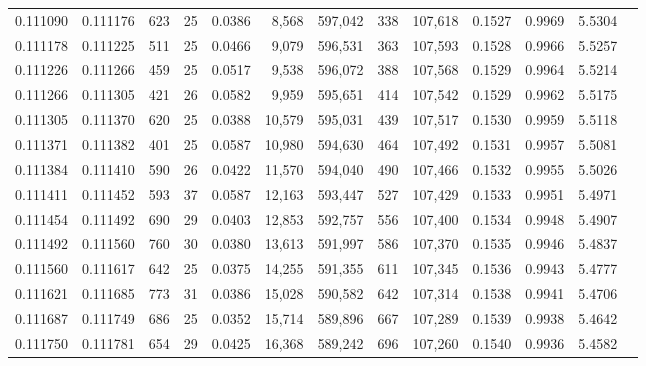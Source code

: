 \begin{tabular}{rrrrrrrrrrrrr}
0.111090 & 0.111176 & 623 &  25 &                                     0.0386 &   8,568 & 597,042 &     338 & 107,618 & 0.1527 & 0.9969 & 5.5304 \\
0.111178 & 0.111225 & 511 &  25 &                                     0.0466 &   9,079 & 596,531 &     363 & 107,593 & 0.1528 & 0.9966 & 5.5257 \\
0.111226 & 0.111266 & 459 &  25 &                                     0.0517 &   9,538 & 596,072 &     388 & 107,568 & 0.1529 & 0.9964 & 5.5214 \\
0.111266 & 0.111305 & 421 &  26 &                                     0.0582 &   9,959 & 595,651 &     414 & 107,542 & 0.1529 & 0.9962 & 5.5175 \\
0.111305 & 0.111370 & 620 &  25 &                                     0.0388 &  10,579 & 595,031 &     439 & 107,517 & 0.1530 & 0.9959 & 5.5118 \\
0.111371 & 0.111382 & 401 &  25 &                                     0.0587 &  10,980 & 594,630 &     464 & 107,492 & 0.1531 & 0.9957 & 5.5081 \\
0.111384 & 0.111410 & 590 &  26 &                                     0.0422 &  11,570 & 594,040 &     490 & 107,466 & 0.1532 & 0.9955 & 5.5026 \\
0.111411 & 0.111452 & 593 &  37 &                                     0.0587 &  12,163 & 593,447 &     527 & 107,429 & 0.1533 & 0.9951 & 5.4971 \\
0.111454 & 0.111492 & 690 &  29 &                                     0.0403 &  12,853 & 592,757 &     556 & 107,400 & 0.1534 & 0.9948 & 5.4907 \\
0.111492 & 0.111560 & 760 &  30 &                                     0.0380 &  13,613 & 591,997 &     586 & 107,370 & 0.1535 & 0.9946 & 5.4837 \\
0.111560 & 0.111617 & 642 &  25 &                                     0.0375 &  14,255 & 591,355 &     611 & 107,345 & 0.1536 & 0.9943 & 5.4777 \\
0.111621 & 0.111685 & 773 &  31 &                                     0.0386 &  15,028 & 590,582 &     642 & 107,314 & 0.1538 & 0.9941 & 5.4706 \\
0.111687 & 0.111749 & 686 &  25 &                                     0.0352 &  15,714 & 589,896 &     667 & 107,289 & 0.1539 & 0.9938 & 5.4642 \\
0.111750 & 0.111781 & 654 &  29 &                                     0.0425 &  16,368 & 589,242 &     696 & 107,260 & 0.1540 & 0.9936 & 5.4582 \\

\end{tabular}

